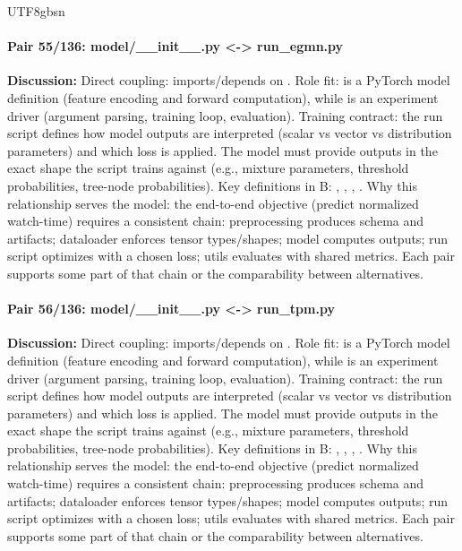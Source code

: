\documentclass[11pt]{article}
\begin{document}
\begin{CJK*}{UTF8}{gbsn}
\paragraph{Pair 55/136: model/\_\_init\_\_.py <-> run\_egmn.py}
\textbf{Discussion:} Direct coupling: \texttt{} imports/depends on \texttt{}. Role fit: \texttt{} is a PyTorch model definition (feature encoding and forward computation), while \texttt{} is an experiment driver (argument parsing, training loop, evaluation). Training contract: the run script defines how model outputs are interpreted (scalar vs vector vs distribution parameters) and which loss is applied. The model must provide outputs in the exact shape the script trains against (e.g., mixture parameters, threshold probabilities, tree-node probabilities). Key definitions in B: \texttt{}, \texttt{}, \texttt{}, \texttt{}. Why this relationship serves the model: the end-to-end objective (predict normalized watch-time) requires a consistent chain: preprocessing produces schema and artifacts; dataloader enforces tensor types/shapes; model computes outputs; run script optimizes with a chosen loss; utils evaluates with shared metrics. Each pair supports some part of that chain or the comparability between alternatives.

\paragraph{Pair 56/136: model/\_\_init\_\_.py <-> run\_tpm.py}
\textbf{Discussion:} Direct coupling: \texttt{} imports/depends on \texttt{}. Role fit: \texttt{} is a PyTorch model definition (feature encoding and forward computation), while \texttt{} is an experiment driver (argument parsing, training loop, evaluation). Training contract: the run script defines how model outputs are interpreted (scalar vs vector vs distribution parameters) and which loss is applied. The model must provide outputs in the exact shape the script trains against (e.g., mixture parameters, threshold probabilities, tree-node probabilities). Key definitions in B: \texttt{}, \texttt{}, \texttt{}, \texttt{}. Why this relationship serves the model: the end-to-end objective (predict normalized watch-time) requires a consistent chain: preprocessing produces schema and artifacts; dataloader enforces tensor types/shapes; model computes outputs; run script optimizes with a chosen loss; utils evaluates with shared metrics. Each pair supports some part of that chain or the comparability between alternatives.


\end{CJK*}
\end{document}
